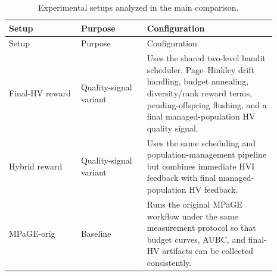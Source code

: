\begin{longtable}{p{0.24\linewidth}p{0.22\linewidth}p{0.43\linewidth}}
\caption[Experimental setup definitions]{Experimental setups analyzed in the main comparison.}
\label{tab:experiment-setups}\\
\toprule
Setup & Purpose & Configuration \\
\midrule
\endfirsthead
\toprule
Setup & Purpose & Configuration \\
\midrule
\endhead
Final-HV reward & Quality-signal variant & Uses the shared two-level bandit scheduler, Page--Hinkley drift handling, budget annealing, diversity/rank reward terms, pending-offspring flushing, and a final managed-population HV quality signal. \\
Hybrid reward & Quality-signal variant & Uses the same scheduling and population-management pipeline but combines immediate HVI feedback with final managed-population HV feedback. \\
MPaGE-orig & Baseline & Runs the original MPaGE workflow under the same measurement protocol so that budget curves, AUBC, and final-HV artifacts can be collected consistently. \\
\bottomrule
\end{longtable}
